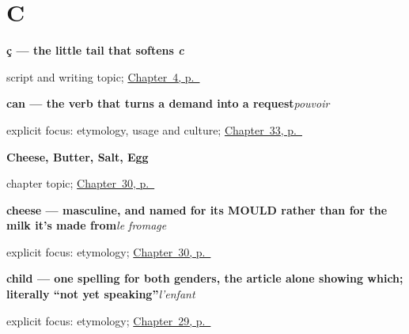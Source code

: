 \section*{C}

\noindent\begin{minipage}[t]{\linewidth}
\raggedright
\textbf{ç — the little tail that softens \emph{c}}\par
\footnotesize script and writing topic; \hyperref[ch:farewells]{Chapter~4, p.~\pageref*{ch:farewells}}
\end{minipage}\par\smallskip

\noindent\begin{minipage}[t]{\linewidth}
\raggedright
\textbf{can — the verb that turns a demand into a request}\enspace\emph{pouvoir}\par
\footnotesize explicit focus: etymology, usage and culture; \hyperref[ch:fr-modaux]{Chapter~33, p.~\pageref*{ch:fr-modaux}}
\end{minipage}\par\smallskip

\noindent\begin{minipage}[t]{\linewidth}
\raggedright
\textbf{Cheese, Butter, Salt, Egg}\par
\footnotesize chapter topic; \hyperref[ch:fr-cheese-butter-salt-egg]{Chapter~30, p.~\pageref*{ch:fr-cheese-butter-salt-egg}}
\end{minipage}\par\smallskip

\noindent\begin{minipage}[t]{\linewidth}
\raggedright
\textbf{cheese — masculine, and named for its MOULD rather than for the milk it's made from}\enspace\emph{le fromage}\par
\footnotesize explicit focus: etymology; \hyperref[ch:fr-cheese-butter-salt-egg]{Chapter~30, p.~\pageref*{ch:fr-cheese-butter-salt-egg}}
\end{minipage}\par\smallskip

\noindent\begin{minipage}[t]{\linewidth}
\raggedright
\textbf{child — one spelling for both genders, the article alone showing which; literally \textquotedblleft{}not yet speaking\textquotedblright{}}\enspace\emph{l'enfant}\par
\footnotesize explicit focus: etymology; \hyperref[ch:fr-the-people-you-introduce]{Chapter~29, p.~\pageref*{ch:fr-the-people-you-introduce}}
\end{minipage}\par\smallskip

